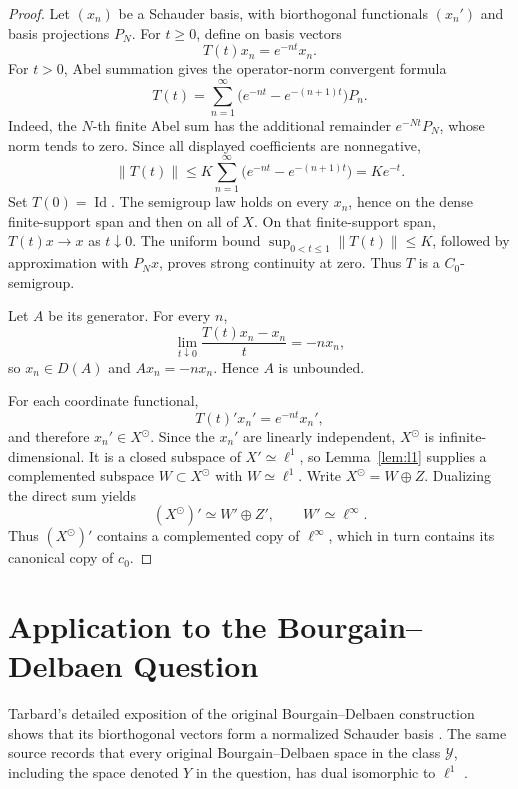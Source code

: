 \documentclass[11pt]{article}
\newcommand{\Id}{\operatorname{Id}}
\newcommand{\ellone}{\ell^{1}}
\newcommand{\ellinf}{\ell^{\infty}}
\begin{document}
\begin{proof}
Let \((x_n)\) be a Schauder basis, with biorthogonal functionals
\((x_n')\) and basis projections \(P_N\).  For \(t\geq0\), define on basis
vectors
\[
  T(t)x_n=e^{-nt}x_n.
\]
For \(t>0\), Abel summation gives the operator-norm convergent formula
\[
  T(t)=\sum_{n=1}^{\infty}
       \bigl(e^{-nt}-e^{-(n+1)t}\bigr)P_n.
\]
Indeed, the \(N\)-th finite Abel sum has the additional remainder
\(e^{-Nt}P_N\), whose norm tends to zero.  Since all displayed coefficients
are nonnegative,
\[
 \|T(t)\|
 \leq K\sum_{n=1}^{\infty}
          \bigl(e^{-nt}-e^{-(n+1)t}\bigr)
 =Ke^{-t}.
\]
Set \(T(0)=\Id\).  The semigroup law holds on every \(x_n\), hence on the
dense finite-support span and then on all of \(X\).  On that finite-support
span, \(T(t)x\to x\) as \(t\downarrow0\).  The uniform bound
\(\sup_{0<t\leq1}\|T(t)\|\leq K\), followed by approximation with \(P_Nx\),
proves strong continuity at zero.  Thus \(T\) is a \(C_0\)-semigroup.

Let \(A\) be its generator.  For every \(n\),
\[
 \lim_{t\downarrow0}\frac{T(t)x_n-x_n}{t}=-n x_n,
\]
so \(x_n\in D(A)\) and \(Ax_n=-n x_n\).  Hence \(A\) is unbounded.

For each coordinate functional,
\[
 T(t)'x_n'=e^{-nt}x_n',
\]
and therefore \(x_n'\in X^\odot\).  Since the \(x_n'\) are linearly
independent, \(X^\odot\) is infinite-dimensional.  It is a closed subspace of
\(X'\simeq\ellone\), so Lemma~\ref{lem:l1} supplies a complemented subspace
\(W\subset X^\odot\) with \(W\simeq\ellone\).  Write
\(X^\odot=W\oplus Z\).  Dualizing the direct sum yields
\[
 (X^\odot)'\simeq W'\oplus Z',
 \qquad W'\simeq\ellinf.
\]
Thus \((X^\odot)'\) contains a complemented copy of \(\ellinf\), which in
turn contains its canonical copy of \(c_0\).
\end{proof}

\section*{Application to the Bourgain--Delbaen Question}

Tarbard's detailed exposition of the original Bourgain--Delbaen construction
shows that its biorthogonal vectors form a normalized Schauder basis
\cite[Chapter 2, especially the discussion following Proposition 2.4.3]
{tarbard}.  The same source records that every original Bourgain--Delbaen
space in the class \(\mathcal Y\), including the space denoted \(Y\) in the
question, has dual isomorphic to \(\ellone\)
\cite[Corollary 2.5.7]{tarbard}.
\end{document}
